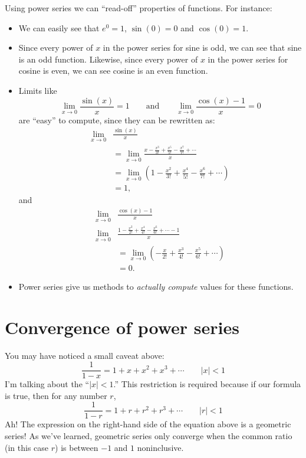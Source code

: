 \documentclass{ximera}
\begin{document}
Using power series we can ``read-off'' properties of functions. For instance:
\begin{itemize}
\item We can easily see that $e^0 =1$, $\sin(0)=0$ and $\cos(0) =1$.
\item Since every power of $x$ in the power series for sine is odd, we
  can see that sine is an odd function. Likewise, since every power of
  $x$ in the power series for cosine is even, we can see cosine is an
  even function.
\item Limits like
  \[
  \lim_{x\to 0}\frac{\sin(x)}{x} = 1\qquad\text{and}\qquad \lim_{x\to 0} \frac{\cos(x)-1}{x} = 0
  \]
  are ``easy'' to compute, since they can be rewritten as:
  \begin{align*}
    \lim_{x\to 0}&\frac{\sin(x)}{x}\\
    &=\lim_{x\to 0} \frac{x - \frac{x^3}{3!} + \frac{x^5}{5!} -\frac{x^7}{7!} + \cdots}{x}\\
    &=\lim_{x\to 0} \left(1 - \frac{x^2}{3!} + \frac{x^4}{5!} -\frac{x^6}{7!} + \cdots\right)\\
    &=1,
  \end{align*}
  and
  \begin{align*}
    \lim_{x\to 0} &\frac{\cos(x)-1}{x}\\
    \lim_{x\to 0} &\frac{1-\frac{x^2}{2!} + \frac{x^4}{4!} -\frac{x^6}{6!} + \cdots-1}{x}\\
    &=\lim_{x\to 0} \left(-\frac{x}{2!} + \frac{x^3}{4!} -\frac{x^5}{6!} + \cdots\right)\\
    &=0.
  \end{align*}
\item Power series give us methods to \textit{actually compute} values
  for these functions.
\end{itemize}

\section{Convergence of power series}

You may have noticed a small caveat above:
\[
\frac{1}{1-x} = 1+ x+ x^2 + x^3 + \cdots \qquad |x|< 1
\]
I'm talking about the ``$|x|<1$.'' This restriction is required because if
our formula is true, then for any number $r$,
\[
\frac{1}{1-r} = 1+ r+ r^2 + r^3 + \cdots \qquad |r|< 1
\]
Ah! The expression on the right-hand side of the equation above is a
geometric series! As we've learned, geometric
series only converge when the common ratio (in this case $r$) is
between $-1$ and $1$ noninclusive.
\end{document}

